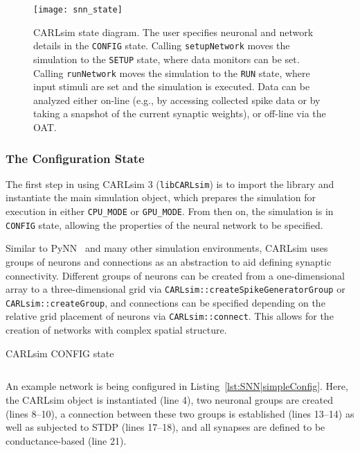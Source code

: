 \begin{figure}[t]
  \centering
  \texttt{[image: snn\_state]}
  \caption{CARLsim state diagram.
  The user specifies neuronal and network details in the
  \texttt{CONFIG} state.
  Calling \texttt{setupNetwork} moves the simulation to the \texttt{SETUP}
  state, where data monitors can be set.
  Calling \texttt{runNetwork} moves the simulation to the \texttt{RUN}
  state, where input stimuli are set and the simulation is executed.
  Data can be analyzed either on-line (e.g., by accessing collected spike
  data or by taking a snapshot of the current synaptic weights),
  or off-line via the \acf{OAT}.}
  \label{fig:SNN|workflow}
\end{figure}


\subsubsection{The Configuration State}
\label{sec:SNN|API|CONFIG}

The first step in using CARLsim 3 (\texttt{libCARLsim}) is to import the
library and instantiate the main simulation object,
which prepares the simulation for execution in either \texttt{CPU\_MODE}
or \texttt{GPU\_MODE}.
From then on, the simulation is in \texttt{CONFIG} state,
allowing the properties of the neural network to be specified.

Similar to PyNN~\citep{Davison2009} and many other simulation
environments, CARLsim uses groups of neurons and
connections as an abstraction to aid defining synaptic
connectivity. Different groups of neurons can be created from a
one-dimensional array to a three-dimensional grid via
\texttt{CARLsim::createSpikeGeneratorGroup}
or \texttt{CARLsim::createGroup}, and
connections can be specified depending on the relative grid
placement of neurons via \texttt{CARLsim::connect}.
This allows for the creation of networks with complex spatial structure.

\begin{listing}[h]
\caption{CARLsim CONFIG state}
\vspace{-0.7cm}
\inputminted{c++}{listings/snn_simple_config.cpp}
\label{lst:SNN|simpleConfig}
\end{listing}

An example network is being configured in Listing~\ref{lst:SNN|simpleConfig}.
Here, the CARLsim object is instantiated (line 4),
two neuronal groups are created (lines 8--10),
a connection between these two groups is established (lines 13--14)
as well as subjected to STDP (lines 17--18),
and all synapses are defined to be conductance-based (line 21).

